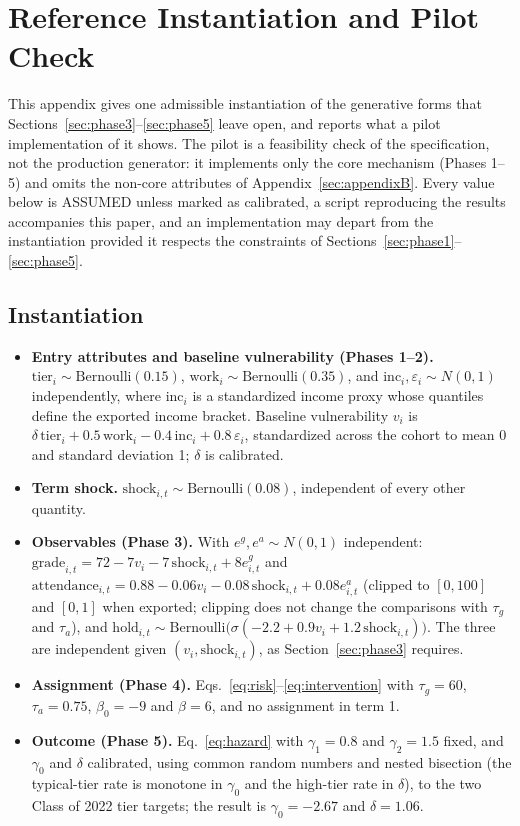 \documentclass[11pt]{article}
\begin{document}
\appendix
\FloatBarrier
\section{Reference Instantiation and Pilot Check}
\label{sec:appendixA}

This appendix gives one admissible instantiation of the generative forms that Sections~\ref{sec:phase3}--\ref{sec:phase5} leave open, and reports what a pilot implementation of it shows. The pilot is a feasibility check of the specification, not the production generator: it implements only the core mechanism (Phases 1--5) and omits the non-core attributes of Appendix~\ref{sec:appendixB}. Every value below is ASSUMED unless marked as calibrated, a script reproducing the results accompanies this paper, and an implementation may depart from the instantiation provided it respects the constraints of Sections~\ref{sec:phase1}--\ref{sec:phase5}.

\subsection{Instantiation}

\begin{itemize}
\item \textbf{Entry attributes and baseline vulnerability (Phases 1--2).} $\text{tier}_i \sim \text{Bernoulli}(0.15)$, $\text{work}_i \sim \text{Bernoulli}(0.35)$, and $\text{inc}_i, \varepsilon_i \sim N(0,1)$ independently, where $\text{inc}_i$ is a standardized income proxy whose quantiles define the exported income bracket. Baseline vulnerability $v_i$ is $\delta\,\text{tier}_i + 0.5\,\text{work}_i - 0.4\,\text{inc}_i + 0.8\,\varepsilon_i$, standardized across the cohort to mean 0 and standard deviation 1; $\delta$ is calibrated.
\item \textbf{Term shock.} $\text{shock}_{i,t} \sim \text{Bernoulli}(0.08)$, independent of every other quantity.
\item \textbf{Observables (Phase 3).} With $e^g, e^a \sim N(0,1)$ independent: $\text{grade}_{i,t} = 72 - 7v_i - 7\,\text{shock}_{i,t} + 8e^g_{i,t}$ and $\text{attendance}_{i,t} = 0.88 - 0.06v_i - 0.08\,\text{shock}_{i,t} + 0.08e^a_{i,t}$ (clipped to $[0,100]$ and $[0,1]$ when exported; clipping does not change the comparisons with $\tau_g$ and $\tau_a$), and $\text{hold}_{i,t} \sim \text{Bernoulli}\big(\sigma(-2.2 + 0.9v_i + 1.2\,\text{shock}_{i,t})\big)$. The three are independent given $(v_i, \text{shock}_{i,t})$, as Section~\ref{sec:phase3} requires.
\item \textbf{Assignment (Phase 4).} Eqs.~\ref{eq:risk}--\ref{eq:intervention} with $\tau_g = 60$, $\tau_a = 0.75$, $\beta_0 = -9$ and $\beta = 6$, and no assignment in term 1.
\item \textbf{Outcome (Phase 5).} Eq.~\ref{eq:hazard} with $\gamma_1 = 0.8$ and $\gamma_2 = 1.5$ fixed, and $\gamma_0$ and $\delta$ calibrated, using common random numbers and nested bisection (the typical-tier rate is monotone in $\gamma_0$ and the high-tier rate in $\delta$), to the two Class of 2022 tier targets; the result is $\gamma_0 = -2.67$ and $\delta = 1.06$.
\end{itemize}
\end{document}
